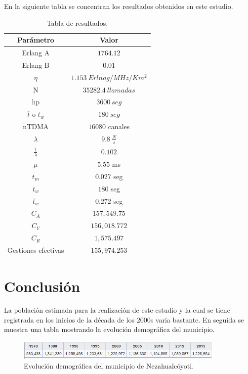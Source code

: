 \documentclass[11pt,letterpaper]{article}
\begin{document}
\newpage
En la siguiente tabla se concentran los resultados obtenidos en este estudio.
\begin{table}[ht]
    \centering
    \begin{tabular}{|c|c|}
    \hline
    Parámetro & Valor   \\ \hline
    Erlang A & $1764.12$  \\ \hline
    Erlang B & $0.01$  \\ \hline
    $\eta$ & $1.153 \ Erlnag/MHz/Km^2$  \\ \hline
    N & $35282.4 \ llamadas$  \\ \hline
    hp & $3600 \ seg$  \\ \hline
    $\overline{t}$ o $t_w$ & $180 \ seg$  \\ \hline
    nTDMA & $16080$ canales  \\ \hline
    $\lambda$ & $9.8 \ \frac{N}{s}$  \\ \hline
    $\frac{1}{\lambda}$ & $0.102$  \\ \hline
    $\mu$ & $5.55$ ms  \\ \hline
    $t_m$ & $0.027$ seg  \\ \hline
    $t_w$ & $180$ seg \\ \hline
    $\overline{t}_w$ & $0.272$ seg  \\ \hline
    $C_A$ & $157,549.75$  \\ \hline
    $C_Y$ & $156,018.772$  \\ \hline
    $C_R$ & $1,575.497$  \\ \hline
    Gestiones efectivas & $155,974.253$  \\ \hline
    \end{tabular}
    \caption{Tabla de resultados.}
    \label{tab:my-table}
\end{table}

\newpage
\section{Conclusión}
La población estimada para la realización de este estudio y la cual se tiene registrada 
en los inicios de la década de los 2000s varia bastante. En seguida se muestra una 
tabla mostrando la evolución demográfica del municipio.
\begin{figure}[ht]
    \centering
    \includegraphics[width=0.9\textwidth]{imagenes/demo.png}
    \caption{Evolución demográfica del municipio de Nezahualcóyotl.}
\end{figure}
\end{document}
